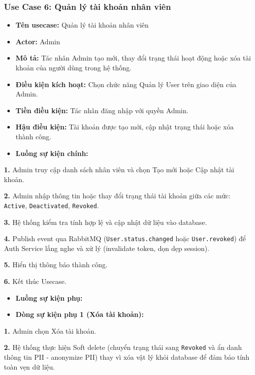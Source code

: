 \documentclass[12pt,a4paper]{report}
\begin{document}
\subsubsection{Use Case 6: Quản lý tài khoản nhân viên}
\begin{itemize}
    \item \textbf{Tên usecase:} Quản lý tài khoản nhân viên
    \item \textbf{Actor:} Admin
    \item \textbf{Mô tả:} Tác nhân Admin tạo mới, thay đổi trạng thái hoạt động hoặc xóa tài khoản của người dùng trong hệ thống.
    \item \textbf{Điều kiện kích hoạt:} Chọn chức năng Quản lý User trên giao diện của Admin.
    \item \textbf{Tiền điều kiện:} Tác nhân đăng nhập với quyền Admin.
    \item \textbf{Hậu điều kiện:} Tài khoản được tạo mới, cập nhật trạng thái hoặc xóa thành công.
    \item \textbf{Luồng sự kiện chính:}
\end{itemize}

\textbf{1.} Admin truy cập danh sách nhân viên và chọn Tạo mới hoặc Cập nhật tài khoản.


\textbf{2.} Admin nhập thông tin hoặc thay đổi trạng thái tài khoản giữa các mức: \texttt{Active}, \texttt{Deactivated}, \texttt{Revoked}.


\textbf{3.} Hệ thống kiểm tra tính hợp lệ và cập nhật dữ liệu vào database.


\textbf{4.} Publish event qua RabbitMQ (\texttt{User.status.changed} hoặc \texttt{User.revoked}) để Auth Service lắng nghe và xử lý (invalidate token, dọn dẹp session).


\textbf{5.} Hiển thị thông báo thành công.


\textbf{6.} Kết thúc Usecase.

\begin{itemize}
    \item \textbf{Luồng sự kiện phụ:}
    \item \textbf{Dòng sự kiện phụ 1 (Xóa tài khoản):}
\end{itemize}

\textbf{1.} Admin chọn Xóa tài khoản.


\textbf{2.} Hệ thống thực hiện Soft delete (chuyển trạng thái sang \texttt{Revoked} và ẩn danh thông tin PII - anonymize PII) thay vì xóa vật lý khỏi database để đảm bảo tính toàn vẹn dữ liệu.
\end{document}

